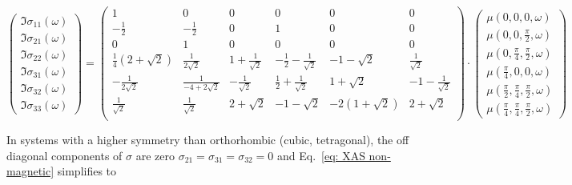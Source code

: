 \documentclass[twocolumn,prb,twocolumn,amsmath,superscriptaddress,nofootinbib,amssymb]{revtex4-1}
\begin{document}
\begin{widetext}
\begin{equation}\label{eq: sigma non-magnetic}
\left(
\begin{array}{c}
\Im{\sigma _{11}}(\omega)  \\
\Im{\sigma _{21}}(\omega)   \\
\Im{\sigma _{22}}(\omega)   \\
\Im{\sigma _{31}}(\omega)   \\
  \Im{\sigma _{32}}(\omega)  \\
  \Im{\sigma _{33}}(\omega)
\end{array}
\right)
=
\left(
\begin{array}{cccccc}
1 & 0 & 0 & 0 & 0 & 0 \\
-\frac{1}{2} & -\frac{1}{2} & 0 & 1 & 0 & 0 \\
0 & 1 & 0 & 0 & 0 & 0 \\
\frac{1}{4} \left(2+\sqrt{2}\right) & \frac{1}{2 \sqrt{2}} & 1+\frac{1}{\sqrt{2}} & -\frac{1}{2}-\frac{1}{\sqrt{2}} & -1-\sqrt{2} & \frac{1}{\sqrt{2}} \\
-\frac{1}{2 \sqrt{2}} & \frac{1}{-4+2 \sqrt{2}} & -\frac{1}{\sqrt{2}} & \frac{1}{2}+\frac{1}{\sqrt{2}} & 1+\sqrt{2} & -1-\frac{1}{\sqrt{2}} \\
\frac{1}{\sqrt{2}} & \frac{1}{\sqrt{2}} & 2+\sqrt{2} & -1-\sqrt{2} & -2 \left(1+\sqrt{2}\right) & 2+\sqrt{2} \\
\end{array}
\right)\cdot
\left(
\begin{array}{c}
\mu(0,0,0,\omega)  \\
\mu(0,0,\frac{\pi}{2},\omega)   \\
\mu(0,\frac{\pi}{4},\frac{\pi}{2},\omega)  \\
\mu(\frac{\pi}{4},0,0,\omega)   \\
\mu(\frac{\pi}{2},\frac{\pi}{4},\frac{\pi}{2},\omega)  \\
\mu(\frac{\pi}{4},\frac{\pi}{4},\frac{\pi}{2},\omega)
\end{array}
\right)
\end{equation}


In systems with a higher symmetry than orthorhombic (cubic, tetragonal), the off diagonal components of $\sigma$ are zero $\sigma_{21}=\sigma_{31}=\sigma_{32}=0$ and Eq.~\ref{eq: XAS non-magnetic} simplifies to


\end{widetext}
\end{document}

